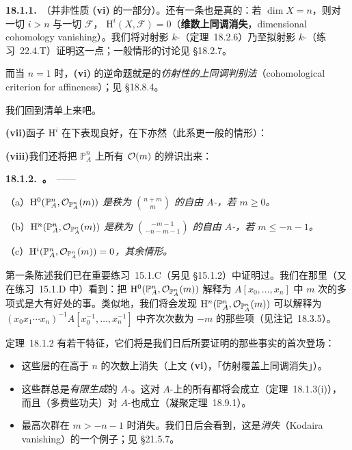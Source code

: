 \textbf{18.1.1.}\ \emph{\trhRemark}（并非性质 \textbf{(vi)} 的一部分）。还有一条也是真的：若 $\dim X=n$，则对一切 $i>n$ 与一切 $\mathscr{F}$，
$\mathrm{H}^i(X,\mathscr{F})=0$（\textbf{维数上同调消失}，dimensional cohomology vanishing）。我们将对射影 $k$-\trScheme（\mbox{定理~18.2.6}）乃至拟射影 $k$-\trScheme（\mbox{练习~22.4.T}）证明这一点；一般情形的讨论见 \S18.2.7。

而当 $n=1$ 时，\textbf{(vi)} 的逆命题就是\trSerre{}的\emph{仿射性的上同调判别法}（cohomological criterion for affineness）；见 \S18.8.4。

我们回到清单上来吧。

\textbf{(vii)}\quad 函子 $\mathrm{H}^i$ 在\trDirectSum{}下表现良好，在\trFiltered\trColimit{}下亦然（此系更一般的情形）：

\textbf{(viii)}\quad 我们还将把 $\mathbb{P}^n_A$ 上所有 $\mathcal{O}(m)$ 的\trCohomology{}辨识出来：

\textbf{18.1.2.\ \trhTheorem。}\ ——

（a）\emph{$\mathrm{H}^0(\mathbb{P}^n_A,\mathcal{O}_{\mathbb{P}^n_A}(m))$ 是秩为 $\binom{n+m}{m}$ 的自由 $A$-\trModule，若 $m\ge 0$。}

（b）\emph{$\mathrm{H}^n(\mathbb{P}^n_A,\mathcal{O}_{\mathbb{P}^n_A}(m))$ 是秩为 $\binom{-m-1}{-n-m-1}$ 的自由 $A$-\trModule，若 $m\le -n-1$。}

（c）\emph{$\mathrm{H}^i(\mathbb{P}^n_A,\mathcal{O}_{\mathbb{P}^n_A}(m))=0$，其余情形。}

第一条陈述我们已在\mbox{重要练习~15.1.C}（另见 \S15.1.2）中证明过。我们在那里（又在\mbox{练习~15.1.D} 中）看到：把
$\mathrm{H}^0(\mathbb{P}^n_A,\mathcal{O}_{\mathbb{P}^n_A}(m))$ 解释为 $A[x_0,\dots,x_n]$ 中 $m$ 次的\trHomogeneous{}多项式是大有好处的事。类似地，我们将会发现
$\mathrm{H}^n(\mathbb{P}^n_A,\mathcal{O}_{\mathbb{P}^n_A}(m))$ 可以解释为
$(x_0x_1\cdots x_n)^{-1}A[x_0^{-1},\dots,x_n^{-1}]$ 中齐次次数为 $-m$ 的那些项（见\mbox{注记~18.3.5}）。

\mbox{定理~18.1.2} 有若干特征，它们将是我们日后所要证明的那些事实的首次登场：
\begin{itemize}[leftmargin=2.6em,itemsep=2pt,topsep=3pt]
\item 这些层的\trCohomology{}在高于 $n$ 的次数上消失（上文 \textbf{(vi)}，「仿射覆盖上同调消失」）。
\item 这些\trCohomology{}群总是\emph{有限生成}的 $A$-\trModule。这对\trProjective{} $A$-\trScheme{}上的所有\trCoherentSheaf{}都将会成立（\mbox{定理~18.1.3(i)}），而且（多费些功夫）对\trProper{} $A$-\trScheme{}也成立（\trGrothendieck{}凝聚定理~18.9.1）。
\item 最高次\trCohomology{}群在 $m>-n-1$ 时消失。我们日后会看到，这是\emph{\trKodaira{}消失}（Kodaira vanishing）的一个例子；见 \S21.5.7。
\end{itemize}

